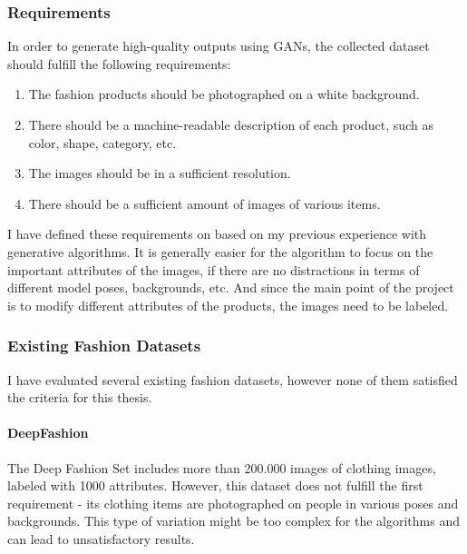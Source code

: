 \documentclass{article}
\begin{document}
\subsubsection{Requirements}

In order to generate high-quality outputs using GANs, the collected dataset should fulfill the following requirements:
\begin{enumerate}
\item The fashion products should be photographed on a white background. 
\item There should be a machine-readable description of each product, such as color, shape, category, etc. 
\item The images should be in a sufficient resolution.
\item There should be a sufficient amount of images of various items.

\end{enumerate}
I have defined these requirements on based on my previous experience with generative algorithms. It is generally easier for the algorithm to focus on the important attributes of the images, if there are no distractions in terms of different model poses, backgrounds, etc. And since the main point of the project is to modify different attributes of the products, the images need to be labeled.

\subsubsection{Existing Fashion Datasets}

I have evaluated several existing fashion datasets, however none of them satisfied the criteria for this thesis.

\paragraph{DeepFashion}
The Deep Fashion Set \cite{liu2016deepfashion} includes more than 200.000 images of clothing images, labeled with 1000 attributes. However, this dataset does not fulfill the first requirement - its clothing items are photographed on people in various poses and backgrounds. This type of variation might be too complex for the algorithms and can lead to unsatisfactory results.
\end{document}
